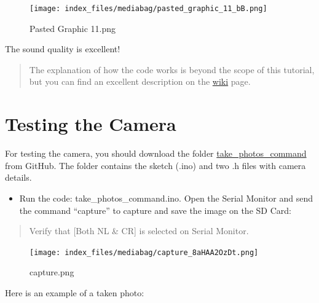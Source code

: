 \documentclass[
  letterpaper,
  DIV=11,
  numbers=noendperiod]{scrreprt}
\providecommand{\tightlist}{%
  \setlength{\itemsep}{0pt}\setlength{\parskip}{0pt}}\usepackage{longtable,booktabs,array}
\begin{document}
\begin{figure}[H]

{\centering \texttt{[image: index\_files/mediabag/pasted\_graphic\_11\_bB.png]}

}

\caption{Pasted Graphic 11.png}

\end{figure}

The sound quality is excellent!

\begin{quote}
The explanation of how the code works is beyond the scope of this
tutorial, but you can find an excellent description on the
\href{https://wiki.seeedstudio.com/xiao_esp32s3_sense_mic\#save-recorded-sound-to-microsd-card}{wiki}
page.
\end{quote}

\hypertarget{testing-the-camera}{%
\section*{Testing the Camera}\label{testing-the-camera}}


For testing the camera, you should download the folder
\href{https://github.com/Mjrovai/XIAO-ESP32S3-Sense/tree/main/take_photos_command}{take\_photos\_command}
from GitHub. The folder contains the sketch (.ino) and two .h files with
camera details.

\begin{itemize}
\tightlist
\item
  Run the code: take\_photos\_command.ino. Open the Serial Monitor and
  send the command ``capture'' to capture and save the image on the SD
  Card:
\end{itemize}

\begin{quote}
Verify that {[}Both NL \& CR{]} is selected on Serial Monitor.
\end{quote}

\begin{figure}[H]

{\centering \texttt{[image: index\_files/mediabag/capture\_8aHAA2OzDt.png]}

}

\caption{capture.png}

\end{figure}

Here is an example of a taken photo:
\end{document}
